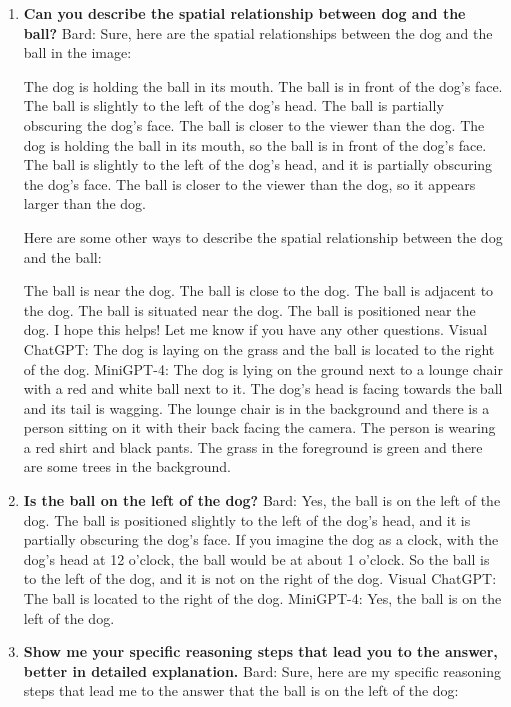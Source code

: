     \begin{enumerate}
        \item \textbf{Can you describe the spatial relationship between dog and the ball?}
        \subitem Bard: 
        Sure, here are the spatial relationships between the dog and the ball in the image:
        
        The dog is holding the ball in its mouth.
        The ball is in front of the dog's face.
        The ball is slightly to the left of the dog's head.
        The ball is partially obscuring the dog's face.
        The ball is closer to the viewer than the dog.
        The dog is holding the ball in its mouth, so the ball is in front of the dog's face. The ball is slightly to the left of the dog's head, and it is partially obscuring the dog's face. The ball is closer to the viewer than the dog, so it appears larger than the dog.
        
        Here are some other ways to describe the spatial relationship between the dog and the ball:
        
        The ball is near the dog.
        The ball is close to the dog.
        The ball is adjacent to the dog.
        The ball is situated near the dog.
        The ball is positioned near the dog.
        I hope this helps! Let me know if you have any other questions.
        \subitem Visual ChatGPT: The dog is laying on the grass and the ball is located to the right of the dog.
        \subitem MiniGPT-4: The dog is lying on the ground next to a lounge chair with a red and white ball next to it. The dog’s head is facing towards the ball and its tail is wagging. The lounge chair is in the background and there is a person sitting on it with their back facing the camera. The person is wearing a red shirt and black pants. The grass in the foreground is green and there are some trees in the background.
        \item \textbf{Is the ball on the left of the dog?}
        \subitem Bard: 
        Yes, the ball is on the left of the dog. The ball is positioned slightly to the left of the dog's head, and it is partially obscuring the dog's face. If you imagine the dog as a clock, with the dog's head at 12 o'clock, the ball would be at about 1 o'clock. So the ball is to the left of the dog, and it is not on the right of the dog.
        \subitem Visual ChatGPT: The ball is located to the right of the dog.
        \subitem MiniGPT-4: Yes, the ball is on the left of the dog.
        \item \textbf{Show me your specific reasoning steps that lead you to the answer, better in detailed explanation.}
        \subitem Bard: 
        Sure, here are my specific reasoning steps that lead me to the answer that the ball is on the left of the dog:
        

\end{enumerate}
